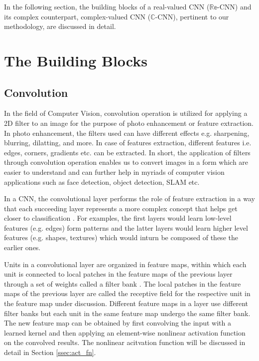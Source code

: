  In the following section, the building blocks of a real-valued CNN ($\mathbb{Re}$-CNN) and its complex counterpart, complex-valued CNN ($\mathbb{C}$-CNN), pertinent to our methodology, are discussed in detail.
 
 \section{The Building Blocks}
 
 
 
 \subsection{Convolution}
  In the field of Computer Vision, convolution operation is utilized for applying a 2D filter to an image for the purpose of photo enhancement or feature extraction. In photo enhancement, the filters used can have different effects e.g. sharpening, blurring, dilatting, and more. In case of features extraction, different features i.e. edges, corners, gradients etc. can be extracted. In short, the application of filters through convolution operation enables us to convert images in a form which are easier to understand and can further help in myriads of computer vision applications such as face detection, object detection, SLAM etc. 
  
  In a CNN, the convolutional layer performs the role of feature extraction in a way that each succeeding layer represents a more complex concept that helps get closer to classification \cite{nature}. For examples, the first layers would learn low-level features (e.g. edges) form patterns and the latter layers would learn higher level features (e.g. shapes, textures) which would inturn be composed of these the earlier ones. 

 
 Units in a convolutional layer are organized in feature maps, within which each unit is connected to local patches in the feature maps of the previous  layer through a set of weights called a filter bank \cite{nature}.  The local patches in the feature maps of the previous layer are called the receptive field for the respective unit in the feature map under discussion. Different feature maps in a layer use different filter banks but each unit in the same feature map undergo the same filter bank. The new feature map can be obtained by first convolving the input with a learned kernel and then applying an element-wise nonlinear activation function on the convolved results\cite{recent_advances}. The nonlinear acitvation function will be discussed in detail in Section \ref{ssec:act_fn}. 
 
